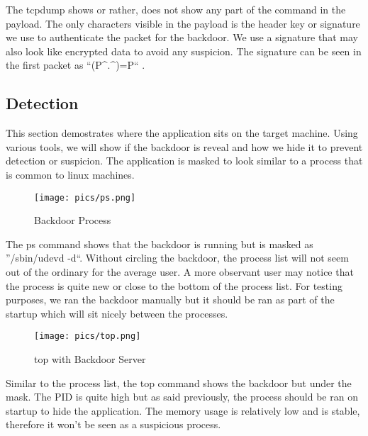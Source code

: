 \documentclass[titlepage]{article}
\begin{document}
The tcpdump shows or rather, does not show any part of the command in the payload.
The only characters visible in the payload is the header key or signature we use
to authenticate the packet for the backdoor. We use a signature that may also look
like encrypted data to avoid any suspicion.  The signature can be seen in the first
packet as ``(P\^{}.\^{})=P`` .\\

\clearpage

\subsection{Detection}

This section demostrates where the application sits on the target machine.  Using
various tools, we will show if the backdoor is reveal and how we hide it to prevent
detection or suspicion.  The application is masked to look similar to a process that
is common to linux machines.\\

\begin{figure}[htb]                                                                       
  \begin{center}
    \texttt{[image: pics/ps.png]}
  \end{center}
  \caption{Backdoor Process}
  \label{fig:bkdoor_ps}
\end{figure}

The ps command shows that the backdoor is running but is masked as\\
''/sbin/udevd -d``. Without circling the backdoor, the process list will not seem
out of the ordinary for the average user.  A more observant user may notice that
the process is quite new or close to the bottom of the process list.  For testing
purposes, we ran the backdoor manually but it should be ran as part of the startup
which will sit nicely between the processes.\\

\begin{figure}[htb]                                                                       
  \begin{center}
    \texttt{[image: pics/top.png]}
  \end{center}
  \caption{top with Backdoor Server}
  \label{fig:bkdoor_top}
\end{figure}

Similar to the process list, the top command shows the backdoor but under the mask.
The PID is quite high but as said previously, the process should be ran on startup
to hide the application.  The memory usage is relatively low and is stable, therefore it
won't be seen as a suspicious process.\\
\end{document}
